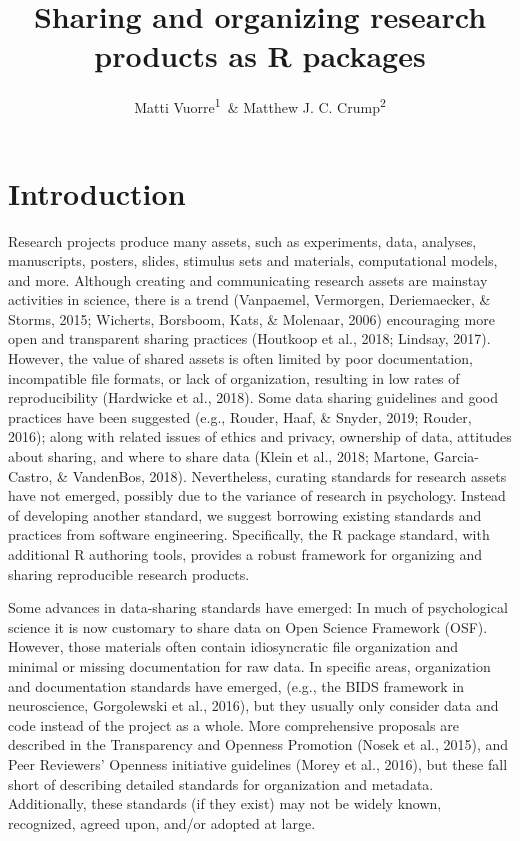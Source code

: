 \documentclass[
  english,
  jou,floatsintext]{apa6}
\author{Matti Vuorre\textsuperscript{1}\ \& Matthew J. C. Crump\textsuperscript{2}}
\affiliation{
\vspace{0.5cm}
\textsuperscript{1} Department of Psychology, Columbia University, New York, USA\\\textsuperscript{2} Department of Psychology, Brooklyn College of CUNY, New York USA}
\title{Sharing and organizing research products as R packages}
\date{}
\begin{document}
\maketitle

\hypertarget{introduction}{%
\section{Introduction}\label{introduction}}

Research projects produce many assets, such as experiments, data, analyses, manuscripts, posters, slides, stimulus sets and materials, computational models, and more. Although creating and communicating research assets are mainstay activities in science, there is a trend (Vanpaemel, Vermorgen, Deriemaecker, \& Storms, 2015; Wicherts, Borsboom, Kats, \& Molenaar, 2006) encouraging more open and transparent sharing practices (Houtkoop et al., 2018; Lindsay, 2017). However, the value of shared assets is often limited by poor documentation, incompatible file formats, or lack of organization, resulting in low rates of reproducibility (Hardwicke et al., 2018). Some data sharing guidelines and good practices have been suggested (e.g., Rouder, Haaf, \& Snyder, 2019; Rouder, 2016); along with related issues of ethics and privacy, ownership of data, attitudes about sharing, and where to share data (Klein et al., 2018; Martone, Garcia-Castro, \& VandenBos, 2018). Nevertheless, curating standards for research assets have not emerged, possibly due to the variance of research in psychology. Instead of developing another standard, we suggest borrowing existing standards and practices from software engineering. Specifically, the R package standard, with additional R authoring tools, provides a robust framework for organizing and sharing reproducible research products.

Some advances in data-sharing standards have emerged: In much of psychological science it is now customary to share data on Open Science Framework (OSF). However, those materials often contain idiosyncratic file organization and minimal or missing documentation for raw data. In specific areas, organization and documentation standards have emerged, (e.g., the BIDS framework in neuroscience, Gorgolewski et al., 2016), but they usually only consider data and code instead of the project as a whole. More comprehensive proposals are described in the Transparency and Openness Promotion (Nosek et al., 2015), and Peer Reviewers' Openness initiative guidelines (Morey et al., 2016), but these fall short of describing detailed standards for organization and metadata. Additionally, these standards (if they exist) may not be widely known, recognized, agreed upon, and/or adopted at large.
\end{document}

